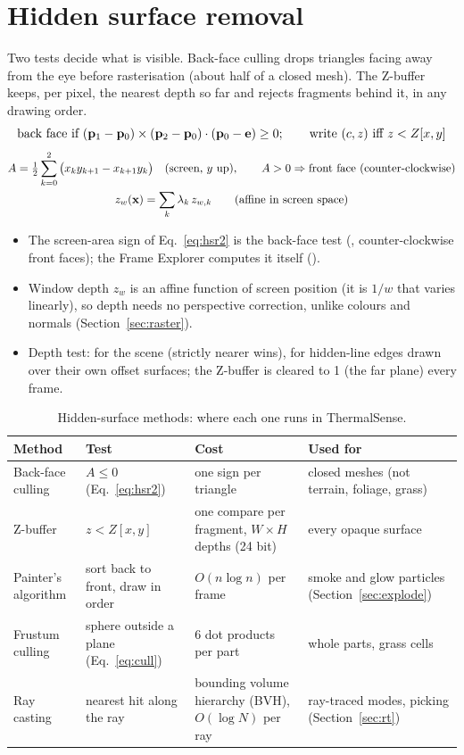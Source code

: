 \section{Hidden surface removal}
\label{sec:hsr}
Two tests decide what is visible. Back-face culling drops triangles facing away from the eye before
rasterisation (about half of a closed mesh). The Z-buffer keeps, per pixel, the nearest depth so far and rejects
fragments behind it, in any drawing order.
\begin{equation}
\text{back face if}\ (\mathbf{p}_1-\mathbf{p}_0)\times(\mathbf{p}_2-\mathbf{p}_0)\cdot(\mathbf{p}_0-\mathbf{e})\ge0;\qquad
\text{write}\ (c,z)\ \text{iff}\ z<Z[x,y]
\label{eq:hsr}
\end{equation}
\begin{gather}
A=\tfrac12\sum_{k=0}^{2}\big(x_ky_{k+1}-x_{k+1}y_k\big)\quad(\text{screen, } y \text{ up}),\qquad A>0\Rightarrow\text{front face (counter-clockwise)}\label{eq:hsr2}\\
z_w(\mathbf{x})=\sum_k\lambda_k\,z_{w,k}\qquad\text{(affine in screen space)}\nonumber
\end{gather}
\begin{itemize}
\item The screen-area sign of Eq.~\eqref{eq:hsr2} is the  back-face test (, counter-clockwise
front faces); the Frame Explorer computes it itself ().
\item Window depth $z_w$ is an affine function of screen position (it is $1/w$ that varies linearly), so depth needs no
perspective correction, unlike colours and normals (Section~\ref{sec:raster}).
\item Depth test:  for the scene (strictly nearer wins),  for hidden-line edges drawn over
their own offset surfaces; the Z-buffer is cleared to 1 (the far plane) every frame.
\end{itemize}

\begin{table}[htbp]
\caption{Hidden-surface methods: where each one runs in ThermalSense.}\label{tab:hsrmethods}
\centering\small
\begin{tabularx}{\linewidth}{@{}lXXl@{}}
\toprule
Method & Test & Cost & Used for\\\midrule
Back-face culling & $A\le0$ (Eq.~\eqref{eq:hsr2}) & one sign per triangle & closed meshes (not terrain, foliage, grass)\\
Z-buffer & $z<Z[x,y]$ & one compare per fragment, $W\times H$ depths (24 bit) & every opaque surface\\
Painter's algorithm & sort back to front, draw in order & $O(n\log n)$ per frame & smoke and glow particles (Section~\ref{sec:explode})\\
Frustum culling & sphere outside a plane (Eq.~\eqref{eq:cull}) & 6 dot products per part & whole parts, grass cells\\
Ray casting & nearest hit along the ray & bounding volume hierarchy (BVH), $O(\log N)$ per ray & ray-traced modes, picking (Section~\ref{sec:rt})\\
\bottomrule
\end{tabularx}
\end{table}

